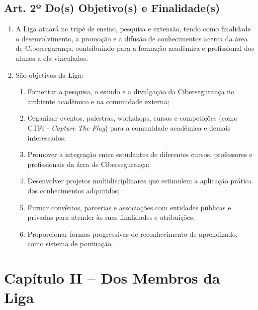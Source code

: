 \documentclass[12pt, a4paper]{article}
\begin{document}
\subsection{Art. 2º Do(s) Objetivo(s) e Finalidade(s)}
\begin{enumerate}[label=\S \arabic*.]
    \item A Liga atuará no tripé de ensino, pesquisa e extensão, tendo como finalidade o desenvolvimento, a promoção e a difusão de conhecimentos acerca da área de Cibersegurança, contribuindo para a formação acadêmica e profissional dos alunos a ela vinculados.
    \item São objetivos da Liga:
    \begin{enumerate}[label=\alph*)]
        \item Fomentar a pesquisa, o estudo e a divulgação da Cibersegurança no ambiente acadêmico e na comunidade externa;
        \item Organizar eventos, palestras, workshops, cursos e competições (como CTFs - \textit{Capture The Flag}) para a comunidade acadêmica e demais interessados;
        \item Promover a integração entre estudantes de diferentes cursos, professores e profissionais da área de Cibersegurança;
        \item Desenvolver projetos multidisciplinares que estimulem a aplicação prática dos conhecimentos adquiridos;
        \item Firmar convênios, parcerias e associações com entidades públicas e privadas para atender às suas finalidades e atribuições.
        \item Proporcionar formas progressivas de reconhecimento de aprendizado, como sistema de pontuação.
    \end{enumerate}
\end{enumerate}


\section{Capítulo II – Dos Membros da Liga}
\end{document}
